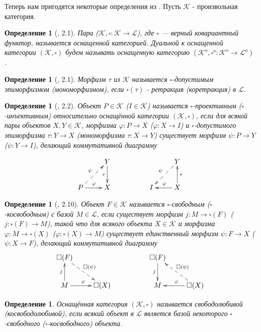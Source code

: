 \documentclass[12pt]{article}
\newtheorem{definition}[theorem]{Определение}
\begin{document}
Теперь нам пригодятся некоторые определения из \cite{HelMetrFrQmod}. Пусть $\mathcal{K}$ - произвольная категория.
\begin{definition}[\cite{HelMetrFrQmod}, 2.1]\label{DefRigCat}
Пара ($\mathcal{K}, \square:\mathcal{K}\to\mathcal{L}$), где $\square$ --- верный ковариантный функтор, называется оснащенной категорией. Дуальной к оснащенной категории $(\mathcal{K}, \square)$ 
будем называть оснащенную категорию $(\mathcal{K}^{o},\square^{o}:\mathcal{K}^{o}\to\mathcal{L}^{o})$. 
\end{definition}
\begin{definition}[\cite{HelMetrFrQmod}, 2.1]\label{DefAdmMorph}
Морфизм $\tau$ из $\mathcal{K}$ называется $\square$-\textit{допустимым} эпиморфизмом (мономорфизмом), если $\square (\tau)$ - ретракция (коретракция) в $\mathcal{L}$.
\end{definition}
\begin{definition}[\cite{HelMetrFrQmod}, 2.2]\label{DefProjInj}
Объект $P \in \mathcal{K}$ ($I \in \mathcal{K}$) называется $\square$-\textit{проективным} ($\square$-\textit{инъективным}) относительно оснащённой категории $(\mathcal{K}, \square)$, если для 
всякой пары объектов $X,Y\in\mathcal{K}$, морфизма $\varphi : P \to X$ ($\varphi : X \to I$) и $\square$-допустимого эпиморфизма $\tau : Y \to X$ (мономорфизма $\tau : X \to Y$)  существует 
морфизм $\psi : P \to Y$ ($\psi : Y \to I$), делающий коммутативной диаграмму

$$
\xymatrix{
& {Y} \ar[d]_{\tau}\\
{P} \ar@{-->}[ur]^{\psi} \ar[r]^{\varphi} &{X}}
\qquad\qquad\quad
\xymatrix{
& {Y} \ar@{-->}[dl]_{\psi} \\
{I} &{X} \ar[l]_{\varphi} \ar[u]_{\tau}}
$$
\end{definition}
\begin{definition}[\cite{HelMetrFrQmod}, 2.10]\label{DefFrAndCoFr}
Объект $F \in \mathcal{K}$ называется $\square$-\textit{свободным} ($\square$-\textit{косвободным}) с \textit{базой} $M \in \mathcal{L}$, если существует морфизм $j : M \to \square(F)$ ($j : \square(F) \to M$), 
такой что для всякого объекта $X \in \mathcal{K}$ и морфизма $\varphi : M \to \square(X)$ ($\varphi : \square(X) \to M$) существует единственный морфизм $\psi : F \to X$ ($\psi : X \to F$), 
делающий коммутативной диаграмму
$$
\xymatrix{
{\square (F)} \ar@{-->}[dr]^{\square (\psi)} & \\
{M} \ar[u]^{j} \ar[r]^{\varphi} &{\square (X)}}
\qquad\qquad\quad
\xymatrix{
{\square (F)} \ar[d]_{j} & \\
{M} &{\square (X)} \ar[l]_\varphi \ar@{-->}[ul]_{\square(\psi)}
}
$$
\end{definition}
\begin{definition}\label{DefFrAndCoFrLove}
Оснащённая категория $(\mathcal{K},\square)$ называется \textit{свободолюбивой} (\textit{косвободолюбивой}), если всякий объект в $\mathcal{L}$ является базой некоторого $\square$-свободного ($\square$-косвободного) объекта.
\end{definition}
\end{document}
